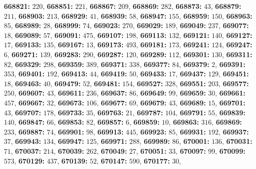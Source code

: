 \textsf{\bfseries 668821:} $220$, \textsf{\bfseries 668851:} $221$, \textsf{\bfseries 668867:} $209$, \textsf{\bfseries 668869:} $282$, \textsf{\bfseries 668873:} $43$, \textsf{\bfseries 668879:} $211$, \textsf{\bfseries 668903:} $213$, \textsf{\bfseries 668929:} $41$, \textsf{\bfseries 668939:} $58$, \textsf{\bfseries 668947:} $155$, \textsf{\bfseries 668959:} $150$, \textsf{\bfseries 668963:} $85$, \textsf{\bfseries 668989:} $28$, \textsf{\bfseries 668999:} $74$, \textsf{\bfseries 669023:} $270$, \textsf{\bfseries 669029:} $189$, \textsf{\bfseries 669049:} $237$, \textsf{\bfseries 669077:} $18$, \textsf{\bfseries 669089:} $57$, \textsf{\bfseries 669091:} $475$, \textsf{\bfseries 669107:} $198$, \textsf{\bfseries 669113:} $132$, \textsf{\bfseries 669121:} $140$, \textsf{\bfseries 669127:} $17$, \textsf{\bfseries 669133:} $135$, \textsf{\bfseries 669167:} $13$, \textsf{\bfseries 669173:} $493$, \textsf{\bfseries 669181:} $173$, \textsf{\bfseries 669241:} $124$, \textsf{\bfseries 669247:} $6$, \textsf{\bfseries 669271:} $139$, \textsf{\bfseries 669283:} $290$, \textsf{\bfseries 669287:} $120$, \textsf{\bfseries 669289:} $112$, \textsf{\bfseries 669301:} $130$, \textsf{\bfseries 669311:} $82$, \textsf{\bfseries 669329:} $298$, \textsf{\bfseries 669359:} $389$, \textsf{\bfseries 669371:} $338$, \textsf{\bfseries 669377:} $84$, \textsf{\bfseries 669379:} $2$, \textsf{\bfseries 669391:} $353$, \textsf{\bfseries 669401:} $192$, \textsf{\bfseries 669413:} $44$, \textsf{\bfseries 669419:} $50$, \textsf{\bfseries 669433:} $17$, \textsf{\bfseries 669437:} $129$, \textsf{\bfseries 669451:} $18$, \textsf{\bfseries 669463:} $40$, \textsf{\bfseries 669479:} $52$, \textsf{\bfseries 669481:} $154$, \textsf{\bfseries 669527:} $328$, \textsf{\bfseries 669551:} $203$, \textsf{\bfseries 669577:} $250$, \textsf{\bfseries 669607:} $43$, \textsf{\bfseries 669611:} $236$, \textsf{\bfseries 669637:} $86$, \textsf{\bfseries 669649:} $99$, \textsf{\bfseries 669659:} $30$, \textsf{\bfseries 669661:} $457$, \textsf{\bfseries 669667:} $32$, \textsf{\bfseries 669673:} $106$, \textsf{\bfseries 669677:} $69$, \textsf{\bfseries 669679:} $43$, \textsf{\bfseries 669689:} $15$, \textsf{\bfseries 669701:} $43$, \textsf{\bfseries 669707:} $178$, \textsf{\bfseries 669733:} $35$, \textsf{\bfseries 669763:} $21$, \textsf{\bfseries 669787:} $104$, \textsf{\bfseries 669791:} $55$, \textsf{\bfseries 669839:} $140$, \textsf{\bfseries 669847:} $66$, \textsf{\bfseries 669853:} $82$, \textsf{\bfseries 669857:} $6$, \textsf{\bfseries 669859:} $10$, \textsf{\bfseries 669863:} $316$, \textsf{\bfseries 669869:} $233$, \textsf{\bfseries 669887:} $74$, \textsf{\bfseries 669901:} $98$, \textsf{\bfseries 669913:} $445$, \textsf{\bfseries 669923:} $85$, \textsf{\bfseries 669931:} $192$, \textsf{\bfseries 669937:} $37$, \textsf{\bfseries 669943:} $134$, \textsf{\bfseries 669947:} $125$, \textsf{\bfseries 669971:} $288$, \textsf{\bfseries 669989:} $86$, \textsf{\bfseries 670001:} $136$, \textsf{\bfseries 670031:} $71$, \textsf{\bfseries 670037:} $214$, \textsf{\bfseries 670039:} $262$, \textsf{\bfseries 670049:} $27$, \textsf{\bfseries 670051:} $33$, \textsf{\bfseries 670097:} $99$, \textsf{\bfseries 670099:} $573$, \textsf{\bfseries 670129:} $437$, \textsf{\bfseries 670139:} $52$, \textsf{\bfseries 670147:} $590$, \textsf{\bfseries 670177:} $30$, 
